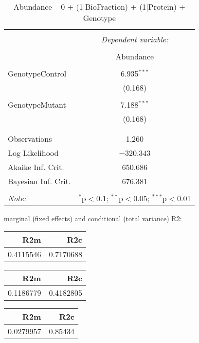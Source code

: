 \documentclass[11pt]{report}
\begin{document}
\begin{table}[!htbp] \centering 
  \caption{Abundance ~ 0 + (1|BioFraction) + (1|Protein) + Genotype} 
  \label{} 
\begin{tabular}{@{\extracolsep{5pt}}lc} 
\\[-1.8ex]\hline 
\hline \\[-1.8ex] 
 & \multicolumn{1}{c}{\textit{Dependent variable:}} \\ 
\cline{2-2} 
\\[-1.8ex] & Abundance \\ 
\hline \\[-1.8ex] 
 GenotypeControl & 6.935$^{***}$ \\ 
  & (0.168) \\ 
  & \\ 
 GenotypeMutant & 7.188$^{***}$ \\ 
  & (0.168) \\ 
  & \\ 
\hline \\[-1.8ex] 
Observations & 1,260 \\ 
Log Likelihood & $-$320.343 \\ 
Akaike Inf. Crit. & 650.686 \\ 
Bayesian Inf. Crit. & 676.381 \\ 
\hline 
\hline \\[-1.8ex] 
\textit{Note:}  & \multicolumn{1}{r}{$^{*}$p$<$0.1; $^{**}$p$<$0.05; $^{***}$p$<$0.01} \\ 
\end{tabular} 
\end{table} 
marginal (fixed effects) and conditional (total variance) R2:

\begin{tabular}{r|r}
\hline
R2m & R2c\\
\hline
0.4115546 & 0.7170688\\
\hline
\end{tabular}

\begin{tabular}{r|r}
\hline
R2m & R2c\\
\hline
0.1186779 & 0.4182805\\
\hline
\end{tabular}

\begin{tabular}{r|r}
\hline
R2m & R2c\\
\hline
0.0279957 & 0.85434\\
\hline
\end{tabular}
\end{document}

